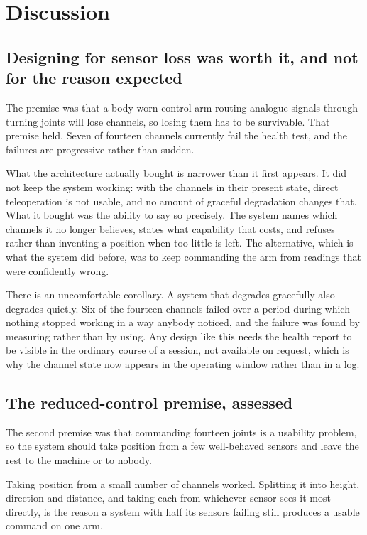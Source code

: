 \chapter{Discussion}
\label{ch:discussion}

\section{Designing for sensor loss was worth it, and not for the reason expected}

The premise was that a body-worn control arm routing analogue signals through
turning joints will lose channels, so losing them has to be survivable. That
premise held. Seven of fourteen channels currently fail the health test, and
the failures are progressive rather than sudden.

What the architecture actually bought is narrower than it first appears. It
did not keep the system working: with the channels in their present state,
direct teleoperation is not usable, and no amount of graceful degradation
changes that. What it bought was the ability to say so precisely. The system
names which channels it no longer believes, states what capability that costs,
and refuses rather than inventing a position when too little is left. The
alternative, which is what the system did before, was to keep commanding the
arm from readings that were confidently wrong.

There is an uncomfortable corollary. A system that degrades gracefully also
degrades quietly. Six of the fourteen channels failed over a period during
which nothing stopped working in a way anybody noticed, and the failure was
found by measuring rather than by using. Any design like this needs the health
report to be visible in the ordinary course of a session, not available on
request, which is why the channel state now appears in the operating window
rather than in a log.

\section{The reduced-control premise, assessed}

The second premise was that commanding fourteen joints is a usability problem,
so the system should take position from a few well-behaved sensors and leave
the rest to the machine or to nobody.

Taking position from a small number of channels worked. Splitting it into
height, direction and distance, and taking each from whichever sensor sees it
most directly, is the reason a system with half its sensors failing still
produces a usable command on one arm.

